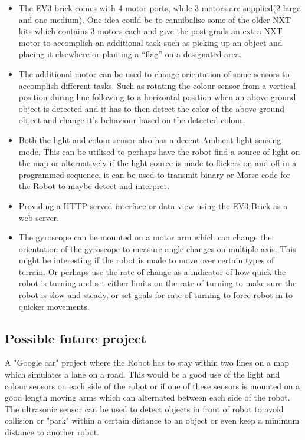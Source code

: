 \documentclass[11pt, a4paper, oneside]{article}
\begin{document}
   		\begin{itemize}
   		\item The EV3 brick comes with 4 motor ports, while 3 motors are supplied(2 large and one medium).  One idea could be to cannibalise some of the older NXT kits which contains 3 motors each and give the post-grads an extra NXT motor to accomplish an additional task such as picking up an object and placing it elsewhere or planting a “flag” on a designated area.
   		
   		\item The additional motor can be used to change orientation of some sensors to accomplish different tasks. Such as rotating the colour sensor from a vertical position during line following to a horizontal position when an above ground object is detected and it has to then detect the color of the above ground object and change it’s behaviour based on the detected colour.
   		
   		\item Both the light and colour sensor also has a decent Ambient light sensing mode. This can be utilised to perhaps have the robot find a source of light on the map or alternatively if the light source is made to flickers on and off in a programmed sequence, it can be used to transmit binary or Morse code for the Robot to maybe detect and interpret. 
   		
   		\item Providing a HTTP-served interface or data-view using the EV3 Brick as a web server.
   		
   		\item The gyroscope can be mounted on a motor arm which can change the orientation of the gyroscope to measure angle changes on multiple axis. This might be interesting if the robot is made to move over certain types of terrain. Or perhaps use the rate of change as a indicator of how quick the robot is turning and set either limits on the rate of turning to make sure the robot is slow and steady, or set goals for rate of turning to force robot in to quicker movements. 
   		\end{itemize}
   		
   		
		\subsection{Possible future project}
		A "Google car" project where the Robot has to stay within two lines on a map which simulates a lane on a road. This would be a good use of the light and colour sensors on each side of the robot or if one of these sensors is mounted on a good length moving arms which can alternated between each side of the robot. The ultrasonic sensor can be used to detect objects in front of robot to avoid collision or "park" within a certain distance to an object or even keep a minimum distance to another robot. \newline
		
\end{document}
